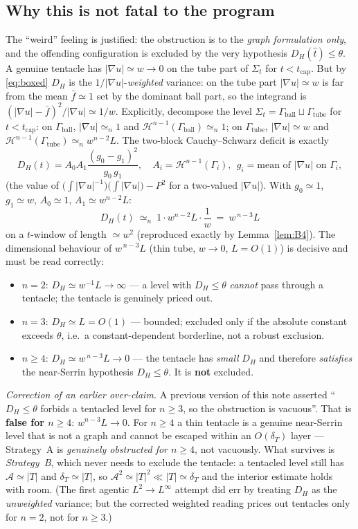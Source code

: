 \documentclass[11pt]{amsart}
\theoremstyle{definition}
\theoremstyle{remark}
\newcommand{\dT}{\delta_T}
\newcommand{\Asym}{\mathcal A}
\newcommand{\Hn}{\mathcal H^{n-1}}
\begin{document}
\subsection{Why this is not fatal to the program}
The ``weird'' feeling is justified: the obstruction is to the \emph{graph
formulation only}, and the offending configuration is excluded by the very
hypothesis $D_H(\hat t)\le\theta$. A genuine tentacle has
$|\nabla u|\simeq w\to0$ on the tube part of $\Sigma_t$ for $t<t_{\mathrm{cap}}$.
But by \eqref{eq:boxed} $D_H$ is the $1/|\nabla u|$-\emph{weighted} variance:
on the tube part $|\nabla u|\simeq w$ is far from the mean $\bar f\simeq1$ set
by the dominant ball part, so the integrand is
$(|\nabla u|-\bar f)^2/|\nabla u|\simeq 1/w$. Explicitly, decompose the level
$\Sigma_t=\Gamma_{\mathrm{ball}}\sqcup\Gamma_{\mathrm{tube}}$ for
$t<t_{\mathrm{cap}}$: on $\Gamma_{\mathrm{ball}}$, $|\nabla u|\simeq_n1$ and
$\Hn(\Gamma_{\mathrm{ball}})\simeq_n1$; on $\Gamma_{\mathrm{tube}}$,
$|\nabla u|\simeq w$ and $\Hn(\Gamma_{\mathrm{tube}})\simeq_n w^{n-2}L$. The
two-block Cauchy--Schwarz deficit is exactly
\[
  D_H(t)=A_0A_1\frac{(g_0-g_1)^2}{g_0\,g_1},\quad
  A_i=\Hn(\Gamma_i),\ \ g_i=\text{mean of }|\nabla u|\text{ on }\Gamma_i,
\]
(the value of $\bigl(\int|\nabla u|^{-1}\bigr)\bigl(\int|\nabla u|\bigr)-P^2$
for a two-valued $|\nabla u|$). With $g_0\simeq1$, $g_1\simeq w$,
$A_0\simeq1$, $A_1\simeq w^{n-2}L$:
\[
  D_H(t)\ \simeq_n\ 1\cdot w^{n-2}L\cdot\frac{1}{w}\ =\ w^{\,n-3}L
\]
on a $t$-window of length $\simeq w^2$ (reproduced exactly by
Lemma~\ref{lem:B4}). The dimensional behaviour of $w^{\,n-3}L$
(thin tube, $w\to0$, $L=O(1)$) is decisive and must be read correctly:
\begin{itemize}
\item $n=2$: $D_H\simeq w^{-1}L\to\infty$ --- a level with $D_H\le\theta$
  \emph{cannot} pass through a tentacle; the tentacle is genuinely
  priced out.
\item $n=3$: $D_H\simeq L=O(1)$ --- bounded; excluded only if the
  absolute constant exceeds $\theta$, i.e.\ a constant-dependent
  borderline, not a robust exclusion.
\item $n\ge4$: $D_H\simeq w^{\,n-3}L\to0$ --- the tentacle has
  \emph{small} $D_H$ and therefore \emph{satisfies} the near-Serrin
  hypothesis $D_H\le\theta$. It is \textbf{not} excluded.
\end{itemize}
\emph{Correction of an earlier over-claim.} A previous version of this
note asserted ``$D_H\le\theta$ forbids a tentacled level for $n\ge3$,
so the obstruction is vacuous''. That is \textbf{false for $n\ge4$}:
$w^{n-3}L\to0$. For $n\ge4$ a thin tentacle is a genuine
near-Serrin level that is not a graph and cannot be escaped within an
$O(\dT)$ layer --- Strategy~A is \emph{genuinely obstructed for
$n\ge4$}, not vacuously. What survives is \emph{Strategy~B}, which
never needs to exclude the tentacle: a tentacled level still has
$\Asym\simeq|T|$ and $\dT\simeq|T|$, so $\Asym^2\simeq|T|^2\ll|T|\simeq\dT$
and the interior estimate holds with room. (The first agentic
$L^2\!\to\!L^\infty$ attempt did err by treating $D_H$ as the
\emph{unweighted} variance; but the corrected weighted reading prices
out tentacles only for $n=2$, not for $n\ge3$.)
\end{document}

